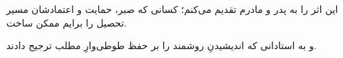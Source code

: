 
این اثر را به پدر و مادرم تقدیم می‌کنم؛
کسانی که صبر، حمایت و اعتمادشان مسیر تحصیل را برایم ممکن ساخت.

و به استادانی که اندیشیدنِ روشمند را بر حفظ طوطی‌وارِ مطلب ترجیح دادند.
